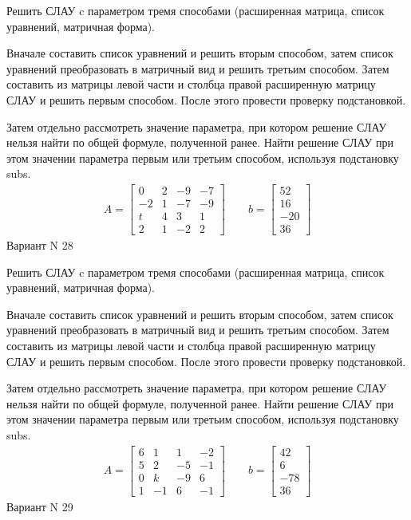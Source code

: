 \documentclass[11pt]{report}
\begin{document}
Решить СЛАУ c параметром тремя способами (расширенная матрица, список уравнений, матричная форма).

Вначале составить список уравнений и решить вторым способом,
затем список уравнений преобразовать в матричный вид и решить третьим способом.
Затем составить из матрицы левой части и столбца правой расширенную матрицу СЛАУ и решить первым способом.
После этого провести проверку подстановкой.

Затем отдельно рассмотреть значение параметра, при котором решение СЛАУ нельзя найти по общей формуле,
полученной ранее.
Найти решение СЛАУ при этом значении параметра первым или третьим способом, используя подстановку subs.
\begin{align*}
    A = \left[\begin{matrix}0 & 2 & -9 & -7\\-2 & 1 & -7 & -9\\t & 4 & 3 & 1\\2 & 1 & -2 & 2\end{matrix}\right]
\qquad b = \left[\begin{matrix}52\\16\\-20\\36\end{matrix}\right]
\end{align*}
\newpage
Вариант N 28


Решить СЛАУ c параметром тремя способами (расширенная матрица, список уравнений, матричная форма).

Вначале составить список уравнений и решить вторым способом,
затем список уравнений преобразовать в матричный вид и решить третьим способом.
Затем составить из матрицы левой части и столбца правой расширенную матрицу СЛАУ и решить первым способом.
После этого провести проверку подстановкой.

Затем отдельно рассмотреть значение параметра, при котором решение СЛАУ нельзя найти по общей формуле,
полученной ранее.
Найти решение СЛАУ при этом значении параметра первым или третьим способом, используя подстановку subs.
\begin{align*}
    A = \left[\begin{matrix}6 & 1 & 1 & -2\\5 & 2 & -5 & -1\\0 & k & -9 & 6\\1 & -1 & 6 & -1\end{matrix}\right]
\qquad b = \left[\begin{matrix}42\\6\\-78\\36\end{matrix}\right]
\end{align*}
\newpage
Вариант N 29
\end{document}
